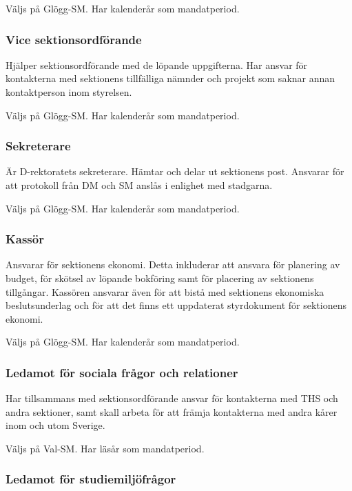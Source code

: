 \documentclass{dgovdoc}
\begin{document}
Väljs på Glögg-SM. Har kalenderår som mandatperiod.

\subsubsection{Vice sektionsordförande}

Hjälper sektionsordförande med de löpande uppgifterna. Har ansvar för
kontakterna med sektionens tillfälliga nämnder och projekt som saknar annan
kontaktperson inom styrelsen.

Väljs på Glögg-SM. Har kalenderår som mandatperiod.

\subsubsection{Sekreterare}

Är D-rektoratets sekreterare. Hämtar och delar ut sektionens post. Ansvarar
för att protokoll från DM och SM anslås i enlighet med stadgarna.

Väljs på Glögg-SM. Har kalenderår som mandatperiod.

\subsubsection{Kassör}

Ansvarar för sektionens ekonomi. Detta inkluderar att ansvara för planering av budget, för skötsel av löpande bokföring samt för placering av sektionens tillgångar. Kassören ansvarar även för att bistå med sektionens ekonomiska beslutsunderlag och för att det finns ett uppdaterat styrdokument för sektionens ekonomi.

Väljs på Glögg-SM. Har kalenderår som mandatperiod.

\subsubsection{Ledamot för sociala frågor och relationer}

Har tillsammans med sektionsordförande ansvar för kontakterna med THS och andra
sektioner, samt skall arbeta för att främja kontakterna med andra kårer inom
och utom Sverige.

Väljs på Val-SM. Har läsår som mandatperiod.

\subsubsection{Ledamot för studiemiljöfrågor}
\end{document}
